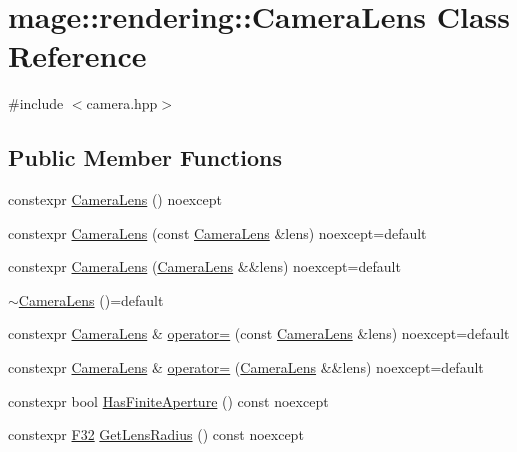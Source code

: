 \hypertarget{classmage_1_1rendering_1_1_camera_lens}{}\section{mage\+:\+:rendering\+:\+:Camera\+Lens Class Reference}
\label{classmage_1_1rendering_1_1_camera_lens}


{\ttfamily \#include $<$camera.\+hpp$>$}

\subsection*{Public Member Functions}
\begin{DoxyCompactItemize}
\item 
constexpr \mbox{\hyperlink{classmage_1_1rendering_1_1_camera_lens_aa17be03069e7150aaaaa12cd2bd161fc}{Camera\+Lens}} () noexcept
\item 
constexpr \mbox{\hyperlink{classmage_1_1rendering_1_1_camera_lens_a69c6788001ad02b1ee229d530ded8fe0}{Camera\+Lens}} (const \mbox{\hyperlink{classmage_1_1rendering_1_1_camera_lens}{Camera\+Lens}} \&lens) noexcept=default
\item 
constexpr \mbox{\hyperlink{classmage_1_1rendering_1_1_camera_lens_a59311c60fc8625a38c04edbb97e23179}{Camera\+Lens}} (\mbox{\hyperlink{classmage_1_1rendering_1_1_camera_lens}{Camera\+Lens}} \&\&lens) noexcept=default
\item 
\mbox{\hyperlink{classmage_1_1rendering_1_1_camera_lens_ad01ffa0adfbdb43e2cf1ed6cbb80092a}{$\sim$\+Camera\+Lens}} ()=default
\item 
constexpr \mbox{\hyperlink{classmage_1_1rendering_1_1_camera_lens}{Camera\+Lens}} \& \mbox{\hyperlink{classmage_1_1rendering_1_1_camera_lens_addbc0f6e5ca70e491022edde1bf6f691}{operator=}} (const \mbox{\hyperlink{classmage_1_1rendering_1_1_camera_lens}{Camera\+Lens}} \&lens) noexcept=default
\item 
constexpr \mbox{\hyperlink{classmage_1_1rendering_1_1_camera_lens}{Camera\+Lens}} \& \mbox{\hyperlink{classmage_1_1rendering_1_1_camera_lens_af2c0c0b55951ecec1aa96d452960fe3f}{operator=}} (\mbox{\hyperlink{classmage_1_1rendering_1_1_camera_lens}{Camera\+Lens}} \&\&lens) noexcept=default
\item 
constexpr bool \mbox{\hyperlink{classmage_1_1rendering_1_1_camera_lens_a09a7cc18ca89da0c177c4f7dc0bbcc41}{Has\+Finite\+Aperture}} () const noexcept
\item 
constexpr \mbox{\hyperlink{namespacemage_aa97e833b45f06d60a0a9c4fc22ae02c0}{F32}} \mbox{\hyperlink{classmage_1_1rendering_1_1_camera_lens_a2cfbec82b5e74c9a481d53944ad6a508}{Get\+Lens\+Radius}} () const noexcept

\end{DoxyCompactItemize}
